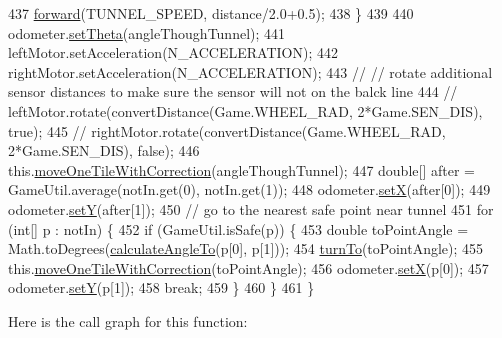 \begin{DoxyCode}
437         \hyperlink{classca_1_1mcgill_1_1ecse211_1_1project_1_1_navigation_a7c66610c5b7496ddb35d342ab2cd3f08}{forward}(TUNNEL\_SPEED, distance/2.0+0.5);
438       \}
439 
440     odometer.\hyperlink{classca_1_1mcgill_1_1ecse211_1_1odometer_1_1_odometer_data_a419b8f07c2c5374411c8e62298e9a402}{setTheta}(angleThoughTunnel);
441     leftMotor.setAcceleration(N\_ACCELERATION);
442     rightMotor.setAcceleration(N\_ACCELERATION);
443 \textcolor{comment}{//    // rotate additional sensor distances to make sure the sensor will not on the balck line}
444 \textcolor{comment}{//    leftMotor.rotate(convertDistance(Game.WHEEL\_RAD, 2*Game.SEN\_DIS), true);}
445 \textcolor{comment}{//    rightMotor.rotate(convertDistance(Game.WHEEL\_RAD, 2*Game.SEN\_DIS), false);}
446     this.\hyperlink{classca_1_1mcgill_1_1ecse211_1_1project_1_1_navigation_afbe677941e2bd44e35452e1eff508ae9}{moveOneTileWithCorrection}(angleThoughTunnel);
447     \textcolor{keywordtype}{double}[] after = GameUtil.average(notIn.get(0), notIn.get(1));
448     odometer.\hyperlink{classca_1_1mcgill_1_1ecse211_1_1odometer_1_1_odometer_data_a2911d7215e47f3064defe016b46bfeef}{setX}(after[0]);
449     odometer.\hyperlink{classca_1_1mcgill_1_1ecse211_1_1odometer_1_1_odometer_data_a82986438cd462e66520bc62bb4bd2b75}{setY}(after[1]);
450     \textcolor{comment}{// go to the nearest safe point near tunnel}
451     \textcolor{keywordflow}{for} (\textcolor{keywordtype}{int}[] p : notIn) \{
452       \textcolor{keywordflow}{if} (GameUtil.isSafe(p)) \{
453         \textcolor{keywordtype}{double} toPointAngle = Math.toDegrees(\hyperlink{classca_1_1mcgill_1_1ecse211_1_1project_1_1_navigation_a4376e54162df8f123ca3b52e4fd2f38d}{calculateAngleTo}(p[0], p[1]));
454         \hyperlink{classca_1_1mcgill_1_1ecse211_1_1project_1_1_navigation_a3bbe0645f2b3b3d0986b4a707fb5a00c}{turnTo}(toPointAngle);
455         this.\hyperlink{classca_1_1mcgill_1_1ecse211_1_1project_1_1_navigation_afbe677941e2bd44e35452e1eff508ae9}{moveOneTileWithCorrection}(toPointAngle);
456         odometer.\hyperlink{classca_1_1mcgill_1_1ecse211_1_1odometer_1_1_odometer_data_a2911d7215e47f3064defe016b46bfeef}{setX}(p[0]);
457         odometer.\hyperlink{classca_1_1mcgill_1_1ecse211_1_1odometer_1_1_odometer_data_a82986438cd462e66520bc62bb4bd2b75}{setY}(p[1]);
458         \textcolor{keywordflow}{break};
459       \}
460     \}
461   \}
\end{DoxyCode}
Here is the call graph for this function\+:
\nopagebreak
